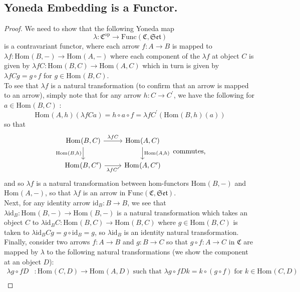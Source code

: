\documentclass{article}
\theoremstyle{definition}
\theoremstyle{remark}
\theoremstyle{definition}
\theoremstyle{definition}
\theoremstyle{definition}
\newcommand{\cat}[1]{\mathfrak{#1}}
\newcommand{\opcat}[1]{\mathfrak{#1}^{\text{op}}}
\newcommand{\Id}[1]{\text{id}_{#1}}
\newcommand{\homset}[3]{\text{Hom}_{#1}(#2,#3)}
\newcommand{\Func}[2]{\text{Func}\left (#1,#2\right )}
\begin{document}
\subsection{Yoneda Embedding is a Functor.}
\label{A-5}
\begin{proof}
	We need to show that the following Yoneda map
	\[\lambda : \opcat{C} \longrightarrow \Func{\cat{C}}{\cat{Set}}\]
	is a contravariant functor, where each arrow $ f : A\to B $ is mapped to  $ \lambda f : \homset{}{B}{-} \to \homset{}{A}{-} $ where each component of the $ \lambda f $ at object $ C $ is given by $ \lambda fC : \homset{}{B}{C}\to \homset{}{A}{C} $ which in turn is given by $ \lambda fC g = g\circ f $ for $ g\in \homset{}{B}{C} $.\\
	To see that $ \lambda f  $ is a natural transformation (to confirm that an arrow is mapped to an arrow), simply note that for any arrow $ h : C\to C^{\prime} $, we have the following for $ a\in \homset{}{B}{C} $ :
	\[\homset{}{A}{h}(\lambda fC a) = h\circ a\circ f = \lambda f C^{\prime} \left (\homset{}{B}{h}(a)\right )\]
	so that 
	\[\begin{tikzcd}
		\homset{}{B}{C}\arrow[swap]{d}{\homset{}{B}{h}} \arrow{r}{\lambda f C} &\homset{}{A}{C}\arrow{d}{\homset{}{A}{h}}\\
		\homset{}{B}{C^{\prime}}\arrow[swap]{r}{\lambda f C^{\prime}} &\homset{}{A}{C^{\prime}}
	\end{tikzcd}\;\text{commutes,}\]
and so $ \lambda f $ is a natural transformation between hom-functors $ \homset{}{B}{-} $ and $ \homset{}{A}{-} $, so that $ \lambda f $ is an arrow in $ \Func{\cat{C}}{\cat{Set}} $. \\
Next, for any identity arrow $ \Id{B} : B\to B $, we see that $ \lambda \Id{B} : \homset{}{B}{-} \longrightarrow \homset{}{B}{-} $ is a natural transformation which takes an object $ C $ to $ \lambda \Id{B} C : \homset{}{B}{C}  \to \homset{}{B}{C}$ where $ g\in  \homset{}{B}{C} $ is taken to $ \lambda \Id{B}Cg = g\circ \Id{B} = g $, so $ \lambda \Id{B} $ is an identity natural transformation.\\
Finally, consider two arrows $ f : A\to B $ and $ g : B\to C $ so that $ g\circ f : A\to C $ in $ \cat{C} $ are mapped by $ \lambda $ to the following natural transformations (we show the component at an object $ D $):
\begin{equation*}
	\begin{split}
		\lambda g\circ f D&: \homset{}{C}{D} \to \homset{}{A}{D}\;\text{such that }\lambda g\circ f D k = k\circ (g\circ f) \;\text{for } k\in \homset{}{C}{D}\\

\end{split}
\end{equation*}
\end{proof}
\end{document}

